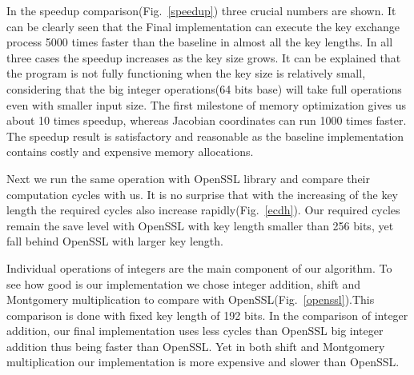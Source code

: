 In the speedup comparison(Fig.~\ref{speedup}) three crucial numbers are shown. It can be clearly seen that the Final implementation can execute the key exchange process 5000 times faster than the baseline in almost all the key lengths. In all three cases the speedup increases as the key size grows. It can be explained that the program is not fully functioning when the key size is relatively small, considering that the big integer operations(64 bits base) will take full operations even with smaller input size. The first milestone of memory optimization gives us about 10 times speedup, whereas Jacobian coordinates can run 1000 times faster. The speedup result is satisfactory and reasonable as the baseline implementation contains costly and expensive memory allocations. 



Next we run the same operation with OpenSSL library and compare their computation cycles with us. It is no surprise that with the increasing of the key length the required cycles also increase rapidly(Fig.~\ref{ecdh}). Our required cycles remain the save level with OpenSSL with key length smaller than 256 bits, yet fall behind OpenSSL with larger key length. 



Individual operations of integers are the main component of our algorithm. To see how good is our implementation we chose integer addition, shift and Montgomery multiplication to compare with OpenSSL(Fig.~\ref{openssl}).This comparison is done with fixed key length of 192 bits. In the comparison of integer addition, our final implementation uses less cycles than OpenSSL big integer addition thus being faster than OpenSSL. Yet in both shift and Montgomery multiplication our implementation is more expensive and slower than OpenSSL. 

